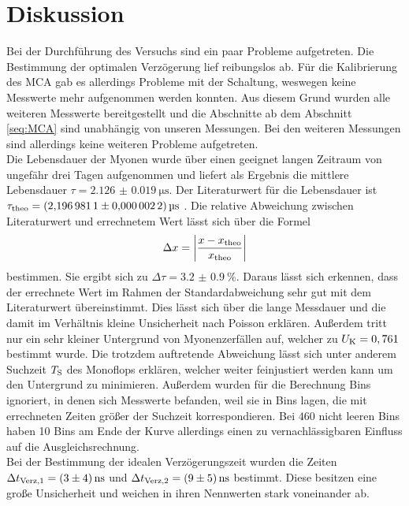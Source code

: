 \newpage
\section{Diskussion}

\noindent
Bei der Durchführung des Versuchs sind ein paar Probleme aufgetreten. 
Die Bestimmung der optimalen Verzögerung lief reibungslos ab. 
Für die Kalibrierung des MCA gab es allerdings Probleme mit der Schaltung, weswegen keine Messwerte mehr aufgenommen werden konnten.
Aus diesem Grund wurden alle weiteren Messwerte bereitgestellt und die Abschnitte ab dem Abschnitt \ref{seq:MCA} sind unabhängig von unseren Messungen.
Bei den weiteren Messungen sind allerdings keine weiteren Probleme aufgetreten.\\
Die Lebensdauer der Myonen wurde über einen geeignet langen Zeitraum von ungefähr drei Tagen aufgenommen und liefert als Ergebnis die mittlere Lebensdauer $\tau = \SI{2.126(0019)}{\micro\second}$.
Der Literaturwert für die Lebensdauer ist \\$\tau_\t{theo} = \SI{2.1969811(00000022)}{\micro\second}$ \cite{PDG}.
Die relative Abweichung zwischen Literaturwert und errechnetem Wert lässt sich über die Formel
\begin{equation*}
    \Delta x = \left| \frac{x - x_\t{theo}}{x_\t{theo}} \right|
\end{equation*}
bestimmen. Sie ergibt sich zu $\Delta \tau =\SI{3.2(09)}{\percent} $. Daraus lässt sich erkennen, dass der errechnete Wert im Rahmen der Standardabweichung sehr gut mit dem Literaturwert übereinstimmt.
Dies lässt sich über die lange Messdauer und die damit im Verhältnis kleine Unsicherheit nach Poisson erklären. 
Außerdem tritt nur ein sehr kleiner Untergrund von Myonenzerfällen auf, welcher zu $U_\t{K} = 0,761$ bestimmt wurde.
Die trotzdem auftretende Abweichung lässt sich unter anderem Suchzeit $T_\t{S}$ des Monoflops erklären, welcher weiter feinjustiert werden kann 
um den Untergrund zu minimieren. Außerdem wurden für die Berechnung Bins ignoriert, in denen sich Messwerte befanden, weil sie in Bins lagen, 
die mit errechneten Zeiten größer der Suchzeit korrespondieren. Bei $460$ nicht leeren Bins haben 10 Bins am Ende der Kurve allerdings einen zu vernachlässigbaren Einfluss auf die Ausgleichsrechnung.   \\ 
Bei der Bestimmung der idealen Verzögerungszeit wurden die Zeiten $\Delta t_\t{Verz,1} = \SI{3 (4)}{\nano\second}$ und  $\Delta t_\t{Verz,2} = \SI{9 (5)}{\nano\second}$ bestimmt.
Diese besitzen eine große Unsicherheit und weichen in ihren Nennwerten stark voneinander ab. 
